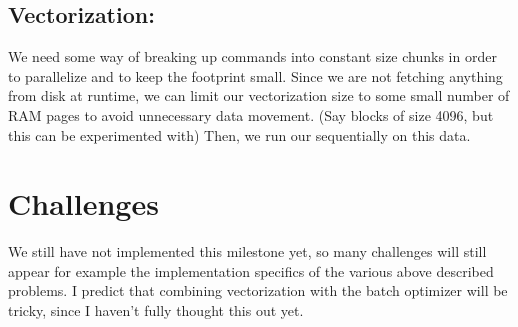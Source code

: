 \documentclass{article}
\begin{document}
\subsection{Vectorization:}
We need some way of breaking up commands into constant size chunks in order to parallelize and to keep the footprint small. Since we are not fetching anything from disk at runtime, we can limit our vectorization size to some small number of RAM pages to avoid unnecessary data movement. (Say blocks of size 4096, but this can be experimented with) Then, we run our sequentially on this data.

\section{Challenges}
We still have not implemented this milestone yet, so many challenges will still appear for example the implementation specifics of the various above described problems. I predict that combining vectorization with the batch optimizer will be tricky, since I haven't fully thought this out yet.
\end{document}
